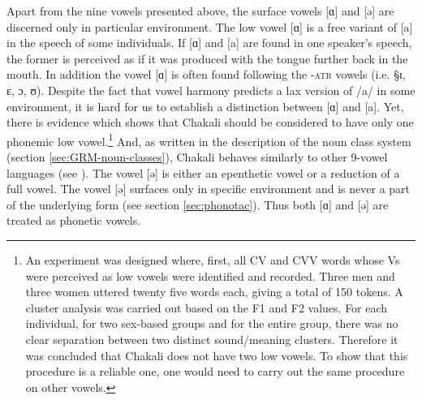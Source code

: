 Apart from the nine vowels presented above, the surface vowels  [ɑ] and [ə] are
discerned only in particular environment. The low vowel [ɑ] is a free variant
of
[a] in the speech of some individuals. If [ɑ] and [a] are found in one speaker's
speech, the former is perceived as if it was produced with the tongue further
back in the mouth. In addition the vowel [ɑ]  is often found  following the
\textsc{-atr} vowels (i.e. {\S ɪ, ɛ, ɔ, ʊ}). Despite the fact that vowel
harmony predicts a lax version of /a/ in some environment, it is hard for us to
establish a distinction between [ɑ] and  [a]. Yet, there
 is  evidence which shows that Chakali should be considered to have only one
phonemic low vowel.\footnote{An experiment  was designed where, first, all CV
and CVV words whose  Vs were perceived as low vowels were identified and
recorded.  Three
men and three women uttered twenty five words each, giving a total of 150
tokens. A cluster analysis was carried out based on the F1 and F2 values. For
each individual, for two sex-based groups and for the entire group, there was no
clear separation between two distinct sound/meaning clusters. Therefore it was
concluded that Chakali does not have two low vowels. To show that this procedure
is a reliable one, one would need to carry out the same procedure on other
vowels.} And, as  written in the description of the  noun class system
(section
\ref{sec:GRM-noun-classes}),  Chakali behaves similarly to other 9-vowel
languages (see \citet[41]{Casa03a}).   The vowel [ə] is
either an epenthetic vowel or a reduction of a
full vowel. The vowel [ə] surfaces only in specific environment and is never a
part of the underlying form (see  section \ref{sec:phonotac}). Thus  
both [ɑ] and   [ə] are treated as phonetic vowels.





